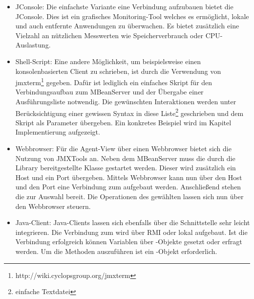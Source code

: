 \begin{itemize}
	\item JConsole: Die einfachste Variante eine Verbindung aufzubauen bietet die JConsole. Dies ist ein grafisches Monitoring-Tool welches es ermöglicht, lokale und auch entfernte Anwendungen zu \"uberwachen. Es bietet zus\"atzlich eine Vielzahl an n\"utzlichen Messwerten wie Speicherverbrauch oder CPU-Auslastung.
	
%
	
	\item Shell-Script: Eine andere Möglichkeit, um beispielsweise einen konsolenbasierten Client zu schrieben, ist durch die Verwendung von jmxterm\footnote{http://wiki.cyclopsgroup.org/jmxterm} gegeben. Daf\"ur ist lediglich ein einfaches Skript f\"ur den Verbindungsaufbau zum MBeanServer und der \"Ubergabe einer Ausf\"uhrungsliste notwendig. Die gew\"unschten Interaktionen werden unter Ber\"ucksichtigung einer gewissen Syntax in diese Liste\footnote{einfache Textdatei} geschrieben und dem Skript als Parameter \"ubergeben. Ein konkretes Beispiel wird im Kapitel Implementierung aufgezeigt.	
	
	\item Webbrowser: F\"ur die Agent-View \"uber einen Webbrowser bietet sich die Nutzung von JMXTools an. Neben dem MBeanServer muss die durch die Library bereitgestellte Klasse  gestartet werden. Dieser wird zusätzlich ein Host und ein Port \"ubergeben. Mittels Webbrowser kann nun über den Host und den Port eine Verbindung zum  aufgebaut werden. Anschlie\ss end stehen die  zur Auswahl bereit. Die Operationen des gewählten  lassen sich nun \"uber den Webbrowser steuern.
	
	
	\item Java-Client: Java-Clients lassen sich ebenfalls über die  Schnittstelle sehr leicht integrieren. Die Verbindung zum  wird \"uber RMI oder lokal aufgebaut. Ist die Verbindung erfolgreich können Variablen über -Objekte gesetzt oder erfragt werden. Um die Methoden auszuführen ist ein -Objekt erforderlich.
\end{itemize}


